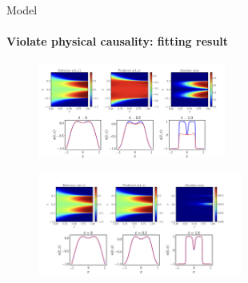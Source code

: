     \begin{frame}{Model}
    \framesubtitle{Violate physical causality: fitting result}
        \begin{figure}[H]
            \centering
            \includegraphics[width=0.55\textwidth]{img/Screenshot 2024-06-02 at 5.03.05 PM}
        \end{figure} 
        \begin{figure}[H]
            \centering
            \includegraphics[width=0.6\textwidth]{img/Screenshot 2024-06-02 at 5.03.17 PM}
        \end{figure} 
    \end{frame}